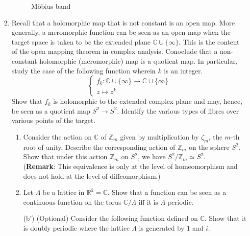 \documentclass[notoc,notitlepage]{tufte-book}
\begin{document}
\begin{enumerate}
\begin{figure}[ht]
      \caption{M\"{o}bius band}
      \label{fig:ass3_mobius_band}
    \end{figure}
  \item Recall that a holomorphic map that is not constant is an open map. More generally,
    a meromorphic function can be seen as an open map when the target space is taken to be the
    extended plane $\mathbb{C} \cup \{ \infty \}$. This is the content of the open mapping theorem
    in complex analysis. Conoclude that a non-constant holomorphic (meromorphic) map is a quotient
    map. In particular, study the case of the following function wherein $k$ is an integer.
    \begin{equation*}
      \begin{cases}
        f_k : \mathbb{C} \cup \{ \infty \} \to \mathbb{C} \cup \{ \infty \} \\
        z \mapsto z^k
      \end{cases}
    \end{equation*}
    Show that $f_k$ is holomorphic to the extended complex plane and may, hence, be seen as a
    quotient map $S^2 \to S^2$. Identify the various types of fibres over various points of the
    target.
    \begin{enumerate}
      \item Consider the action on $\mathbb{C}$ of $\mathbb{Z}_m$ given by multiplication by
        $\zeta_m$, the $m$-th root of unity. Describe the corresponding action of $\mathbb{Z}_m$
        on the sphere $S^2$. Show that under this action $\mathbb{Z}_m$ on $S^2$, we have
        $S^2 / \mathbb{Z}_m \simeq S^2$. \\
        (\textbf{Remark}: This equivalence is only at the level of homeomorphism and does not
        hold at the level of diffeomorphism.)
      \item Let $\Lambda$ be a lattice in $\mathbb{R}^2 = \mathbb{C}$. Show that a function can be
        seen as a continuous function on the torus $\mathbb{C} / \Lambda$ iff it is 
        $\Lambda$-periodic.
      \item[(b')] (Optional) Consider the following function defined on $\mathbb{C}$. Show that it
        is doubly periodic where the lattice $\Lambda$ is generated by $1$ and $i$.

\end{enumerate}
\end{enumerate}
\end{document}
